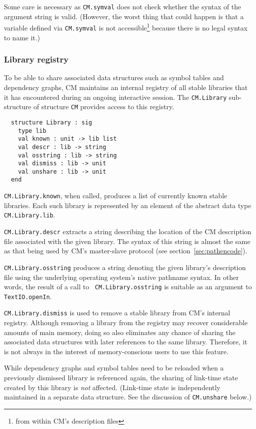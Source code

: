 \documentclass[titlepage,letterpaper]{article}
\begin{document}
Some care is necessary as {\tt CM.symval} does not check whether the
syntax of the argument string is valid.  (However, the worst thing
that could happen is that a variable defined via {\tt CM.symval} is
not accessible\footnote{from within CM's description files} because
there is no legal syntax to name it.)

\subsubsection*{Library registry}
\label{sec:libreg}

To be able to share associated data structures such as symbol tables
and dependency graphs, CM maintains an internal registry of all stable
libraries that it has encountered during an ongoing interactive
session.  The {\tt CM.Library} sub-structure of structure {\tt CM}
provides access to this registry.

\begin{verbatim}
  structure Library : sig
    type lib
    val known : unit -> lib list
    val descr : lib -> string
    val osstring : lib -> string
    val dismiss : lib -> unit
    val unshare : lib -> unit
  end
\end{verbatim}

{\tt CM.Library.known}, when called, produces a list of currently
known stable libraries.  Each such library is represented by an
element of the abstract data type {\tt CM.Library.lib}.

{\tt CM.Library.descr} extracts a string describing the location of
the CM description file associated with the given library.  The syntax
of this string is almost the same as that being used by CM's
master-slave protocol (see section~\ref{sec:pathencode}).

{\tt CM.Library.osstring} produces a string denoting the given
library's description file using the underlying operating system's
native pathname syntax.  In other words, the result of a call to {\tt
CM.Library.osstring} is suitable as an argument to {\tt
TextIO.openIn}.

{\tt CM.Library.dismiss} is used to remove a stable library from CM's
internal registry.  Although removing a library from the registry may
recover considerable amounts of main memory, doing so also eliminates
any chance of sharing the associated data structures with later
references to the same library.  Therefore, it is not always in the
interest of memory-conscious users to use this feature.

While dependency graphs and symbol tables need to be reloaded when a
previously dismissed library is referenced again, the sharing of
link-time state created by this library is {\em not} affected.
(Link-time state is independently maintained in a separate data
structure.  See the discussion of {\tt CM.unshare} below.)
\end{document}
